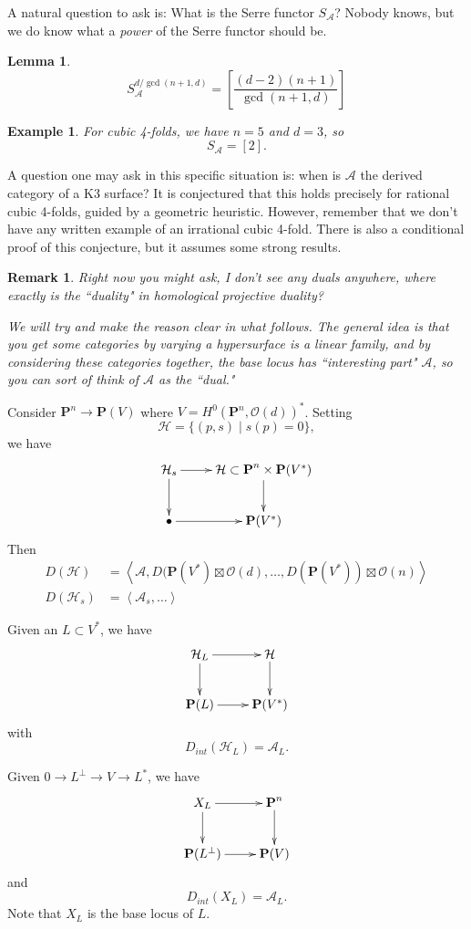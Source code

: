 \documentclass{amsart}
\newtheorem*{lem}{Lemma}
\newtheorem*{ex}{Example}
\newtheorem*{rem}{Remark}
\newcommand{\A}{\mathcal{A}}
\newcommand{\PP}{\textbf{P}}
\newcommand{\Oh}{\mathcal{O}}
\renewcommand{\H}{\mathcal{H}}
\begin{document}
A natural question to ask is: What is the Serre functor $S_\A$? Nobody knows, but we do know what a \textit{power} of the Serre functor should be.

\begin{lem}
\[
S_\A^{d/\gcd(n+1,d)} = \left[ \frac{(d-2)(n+1)}{\gcd(n+1, d)}\right]
\]
\end{lem}

\begin{ex}
For cubic 4-folds, we have $n = 5$ and $d = 3$, so
\[
S_\A = [2].
\]
\end{ex}

A question one may ask in this specific situation is: when is $\A$ the derived category of a K3 surface? It is conjectured that this holds precisely for rational cubic 4-folds, guided by a geometric heuristic. However, remember that we don't have any written example of an irrational cubic 4-fold. There is also a conditional proof of this conjecture, but it assumes some strong results.


\begin{rem}
Right now you might ask, I don't see any duals anywhere, where exactly is the ``duality" in homological projective duality?

We will try and make the reason clear in what follows. The general idea is that you get some categories by varying a hypersurface is a linear family, and by considering these categories together, the base locus has ``interesting part" $\A$, so you can sort of think of $\A$ as the ``dual." 
\end{rem}

Consider $\PP^n \to \PP(V)$ where $V = H^0(\PP^n, \Oh(d))^*$. Setting
\[
\H = \{(p,s) \mid s(p) = 0\},
\]
we have
\[
\xymatrix{
\H_s \ar[r] \ar[d] & \H \subset \PP^n \times \PP(V^*) \ar[d] \\
\bullet \ar[r]& \PP(V^*)
}
\]
Then
\begin{align*}
D(\H) &= \left<\A, D(\PP(V^*) \boxtimes \Oh(d), \ldots, D(\PP(V^*)) \boxtimes \Oh(n) \right> \\
D(\H_s) &= \left<\A_s, \ldots \right>
\end{align*}

Given an $L \subset V^*$, we have
\[
\xymatrix{
\H_L \ar[r] \ar[d] &  \H \ar[d] \\
\PP(L) \ar[r] & \PP(V^*)
}
\]
with
\[
D_{int}(\H_L) = \A_L.
\]

Given $0 \to L^\perp \to V \to L^*$, we have
\[
\xymatrix{
X_L \ar[r] \ar[d] & \PP^n  \ar[d] \\
\PP(L^\perp) \ar[r] & \PP(V)
}
\]
and
\[
D_{int}(X_L) = \A_L.
\]
Note that $X_L$ is the base locus of $L$.
\end{document}
